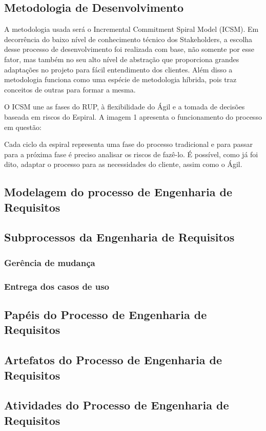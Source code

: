   \subsection{Metodologia de Desenvolvimento}
  
  A metodologia usada será o Incremental Commitment Spiral Model (ICSM). Em decorrência do baixo nível de conhecimento técnico dos Stakeholders, a escolha desse processo de desenvolvimento foi realizada com base, não somente por esse fator, mas também no seu alto nível de abstração que proporciona grandes adaptações no projeto para fácil entendimento dos clientes. Além disso a metodologia funciona como uma espécie de metodologia híbrida, pois traz conceitos de outras para formar a mesma.

  O ICSM une as fases do RUP, à flexibilidade do Ágil e a tomada de decisões baseada em riscos do Espiral. A imagem 1 apresenta o funcionamento do processo em questão:

  Cada ciclo da espiral representa uma fase do processo tradicional e para passar para a próxima fase é preciso analisar os riscos de fazê-lo. É possível, como já foi dito, adaptar o processo para as necessidades do cliente, assim como o Ágil.

  \subsection{Modelagem do processo de Engenharia de Requisitos}
  \subsection{Subprocessos da Engenharia de Requisitos}
    \subsubsection{Gerência de mudança}
    \subsubsection{Entrega dos casos de uso}
  \subsection{Papéis do Processo de Engenharia de Requisitos}
  \subsection{Artefatos do Processo de Engenharia de Requisitos}
  \subsection{Atividades do Processo de Engenharia de Requisitos}

